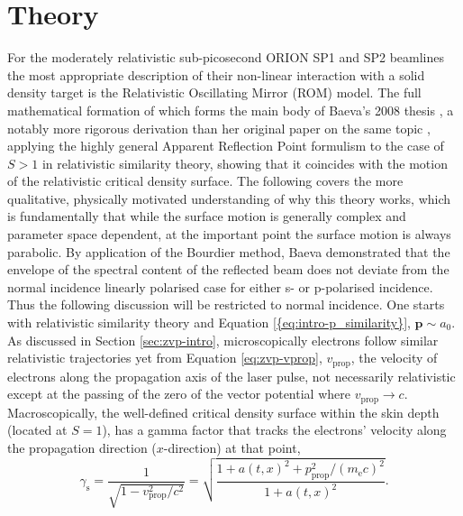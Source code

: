 \section{\label{ch:3-sec:theory}Theory}
For the moderately relativistic sub-picosecond ORION SP1 and SP2 beamlines the most appropriate description of their non-linear interaction with a solid density target is the Relativistic Oscillating Mirror (ROM) model. The full mathematical formation of which forms the main body of Baeva's 2008 thesis \cite{baevaHighHarmonicGeneration2008}, a notably more rigorous derivation than her original paper on the same topic \cite{baevaTheoryHighorderHarmonic2006}, applying the highly general Apparent Reflection Point formulism to the case of $S>1$ in relativistic similarity theory, showing that it coincides with the motion of the relativistic critical density surface. The following covers the more qualitative, physically motivated understanding of why this theory works, which is fundamentally that while the surface motion is generally complex and parameter space dependent, at the important point the surface motion is always parabolic. By application of the Bourdier method, Baeva demonstrated that the envelope of the spectral content of the reflected beam does not deviate from the normal incidence linearly polarised case for either s- or p-polarised incidence. Thus the following discussion will be restricted to normal incidence. One starts with relativistic similarity theory and Equation \ref{{eq:intro-p_similarity}}, $\mathbf{p} \sim a_0$. As discussed in Section \ref{sec:zvp-intro}, microscopically electrons follow similar relativistic trajectories yet from Equation \ref{eq:zvp-vprop}, $v_\mathrm{prop}$, the velocity of electrons along the propagation axis of the laser pulse, not necessarily relativistic except at the passing of the zero of the vector potential where $v_\mathrm{prop} \to c$. Macroscopically, the well-defined critical density surface within the skin depth (located at $S =1$), has a gamma factor that tracks the electrons' velocity along the propagation direction ($x$-direction) at that point,
\begin{equation}\label{eq:orion-gamma_s}
	\gamma_\mathrm{s} = \frac{1}{\sqrt{1-v_\mathrm{prop}^2/c^2}} = \sqrt{ \frac{1 + a(t,x)^2 +  p_\mathrm{prop}^2/(m_\mathrm{e}c)^2}{1 + a(t,x)^2}}.
\end{equation}
